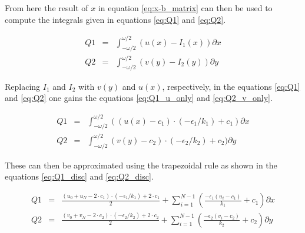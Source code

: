 \begin{landscape}
From here the result of $x$ in equation \ref{eq:x-b_matrix} can then be used to compute the integrals given in equations \ref{eq:Q1} and \ref{eq:Q2}.

\begin{eqnarray}
Q1 &=& \int ^{\omega / 2}_{-\omega /2} (u(x)-I_1(x)) \partial x %
\label{eq:Q1}\\
Q2 &=& \int ^{\omega / 2}_{-\omega /2} (v(y)-I_2(y)) \partial y %
\label{eq:Q2}
\end{eqnarray}

\end{landscape}


Replacing $I_1$ and $I_2$ with $v(y)$ and $u(x)$, respectively, in the equations \ref{eq:Q1} and \ref{eq:Q2} one gains the equations \ref{eq:Q1_u_only} and \ref{eq:Q2_v_only}.

\begin{eqnarray}
Q1 &=& \int ^{\omega / 2}_{-\omega /2} ((u(x)-c_1)\cdot(-\epsilon_1/k_1)+c_1) \partial x \label{eq:Q1_u_only}\\
Q2 &=& \int ^{\omega / 2}_{-\omega /2} (v(y)-c_2)\cdot(-\epsilon_2/k_2)+c_2) \partial y  \label{eq:Q2_v_only}
\end{eqnarray}

These can then be approximated using the trapezoidal rule as shown in the equations \ref{eq:Q1_disc} and \ref{eq:Q2_disc}.

\begin{eqnarray}
Q1 &=& \frac{(u_0 + u_N - 2 \cdot c_1)\cdot(-\epsilon_1/k_1) + 2 \cdot c_1}{2} + \sum ^{N-1}_{i = 1} \left(\frac{-\epsilon_1(u_i-c_1)}{k_1}+c_1\right) \partial x \label{eq:Q1_disc}\\
Q2 &=& \frac{(v_0 + v_N - 2 \cdot c_2)\cdot(-\epsilon_2/k_2) + 2 \cdot c_2}{2} + \sum ^{N-1}_{i = 1} \left(\frac{-\epsilon_2(v_i-c_2)}{k_2}+c_2\right) \partial y \label{eq:Q2_disc}
\end{eqnarray}


